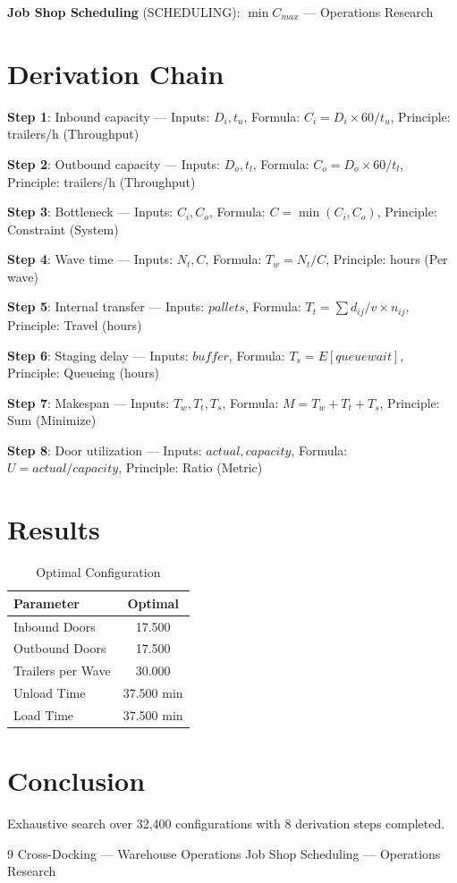 \documentclass[11pt,twocolumn]{article}
\begin{document}
\textbf{Job Shop Scheduling} (SCHEDULING): $\min C_{max}$ --- Operations Research


\section{Derivation Chain}
\textbf{Step 1}: Inbound capacity --- Inputs: $D_i, t_u$, Formula: $C_i = D_i \times 60/t_u$, Principle: trailers/h (Throughput)


\textbf{Step 2}: Outbound capacity --- Inputs: $D_o, t_l$, Formula: $C_o = D_o \times 60/t_l$, Principle: trailers/h (Throughput)


\textbf{Step 3}: Bottleneck --- Inputs: $C_i, C_o$, Formula: $C = \min(C_i, C_o)$, Principle: Constraint (System)


\textbf{Step 4}: Wave time --- Inputs: $N_t, C$, Formula: $T_w = N_t/C$, Principle: hours (Per wave)


\textbf{Step 5}: Internal transfer --- Inputs: $pallets$, Formula: $T_t = \sum d_{ij}/v \times n_{ij}$, Principle: Travel (hours)


\textbf{Step 6}: Staging delay --- Inputs: $buffer$, Formula: $T_s = E[queue wait]$, Principle: Queueing (hours)


\textbf{Step 7}: Makespan --- Inputs: $T_w, T_t, T_s$, Formula: $M = T_w + T_t + T_s$, Principle: Sum (Minimize)


\textbf{Step 8}: Door utilization --- Inputs: $actual, capacity$, Formula: $U = actual/capacity$, Principle: Ratio (Metric)


\section{Results}
\begin{table}[h]
\centering
\caption{Optimal Configuration}
\begin{tabular}{@{}lc@{}}
\toprule
Parameter & Optimal \\
\midrule
Inbound Doors & 17.500  \\
Outbound Doors & 17.500  \\
Trailers per Wave & 30.000  \\
Unload Time & 37.500 min \\
Load Time & 37.500 min \\
\bottomrule
\end{tabular}
\end{table}

\section{Conclusion}
Exhaustive search over 32,400 configurations with 8 derivation steps completed.

\begin{thebibliography}{9}
 Cross-Docking --- Warehouse Operations
 Job Shop Scheduling --- Operations Research
\end{thebibliography}
\end{document}
